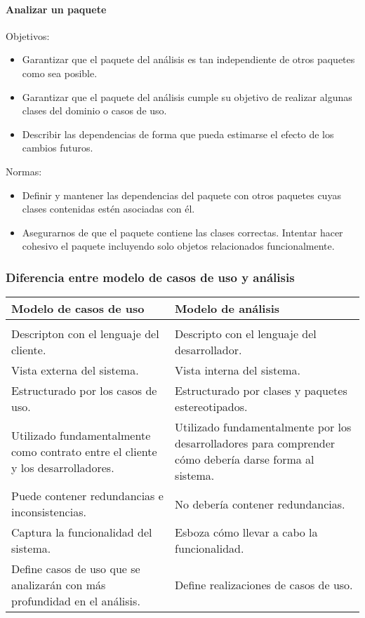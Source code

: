 \paragraph{Analizar un paquete}
Objetivos:
\begin{itemize}
\item Garantizar que el paquete del análisis es tan independiente de otros paquetes como sea posible.
\item Garantizar que el paquete del análisis cumple su objetivo de realizar algunas clases del dominio o casos de uso.
\item Describir las dependencias de forma que pueda estimarse el efecto de los cambios futuros.
\end{itemize}
Normas:
\begin{itemize}
\item Definir y mantener las dependencias del paquete con otros paquetes cuyas clases contenidas estén asociadas con él.
\item Asegurarnos de que el paquete contiene las clases correctas. Intentar hacer cohesivo el paquete incluyendo solo objetos relacionados funcionalmente.
\end{itemize}
\subsubsection{Diferencia entre modelo de casos de uso y análisis}
\begin{center}
\begin{tabu}{p{7cm}|p{7cm}}
\rowfont{\bfseries\itshape\large} Modelo de casos de uso & Modelo de análisis\\
\hline
\\[2pt]

Descripton con el lenguaje del cliente. &
Descripto con el lenguaje del desarrollador.\\[2pt]
Vista externa del sistema. &
Vista interna del sistema.\\[2pt]
Estructurado por los casos de uso. &
Estructurado por clases y paquetes estereotipados.\\[2pt]
Utilizado fundamentalmente como contrato entre el cliente y los desarrolladores. &
Utilizado fundamentalmente por los desarrolladores para comprender cómo debería darse forma al sistema.\\[2pt]
Puede contener redundancias e inconsistencias. &
No debería contener redundancias.\\[2pt]
Captura la funcionalidad del sistema.&
Esboza cómo llevar a cabo la funcionalidad.\\[2pt]
Define casos de uso que se analizarán con más profundidad en el análisis. &
Define realizaciones de casos de uso.
\end{tabu}
\end{center}
